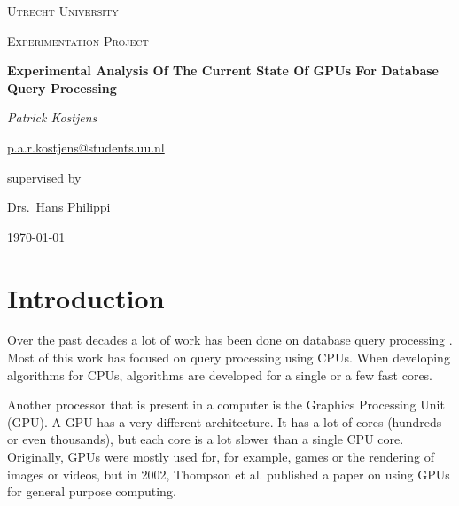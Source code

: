 \documentclass[a4paper,titlepage]{article}
\begin{document}
\begin{titlepage}
	\centering
	{\scshape\LARGE Utrecht University \par}
	\vspace{1cm}
	{\scshape\Large Experimentation Project \par}
	\vspace{1.5cm}
	{\huge\bfseries Experimental Analysis Of The Current State Of GPUs For Database Query Processing\par}
	\vspace{2cm}
	
	{\Large\itshape Patrick Kostjens \par}
	\href{mailto:p.a.r.kostjens@students.uu.nl}{p.a.r.kostjens@students.uu.nl}
	\vfill
	
	supervised by\par
	Drs.~Hans Philippi
	\vfill

	{\large \today\par}
\end{titlepage}

\begin{abstract}
So far, database query processing has mostly been done using CPUs. However, recent research shows that GPUs might be able to improve the query processing performance. In this experimental analysis, we implement filter and join algorithms on both the CPU and the GPU. We compare their performance and look at some important factors that influence the performance. This gives us an idea of the current possibilities of GPUs for database query processing. We find that there are some problems with GPUs that severely limit the current applications. However, GPUs do have the potential to play an important role in speeding up database queries.

\textbf{Keywords:} query processing, graphics processing unit, relational database, parallel processing, CUDA
\end{abstract}

\section{Introduction}
Over the past decades a lot of work has been done on database query processing \cite{selinger1979,king1981,bratbergsengen1984}. Most of this work has focused on query processing using CPUs. When developing algorithms for CPUs, algorithms are developed for a single or a few fast cores.

Another processor that is present in a computer is the Graphics Processing Unit (GPU). A GPU has a very different architecture. It has a lot of cores (hundreds or even thousands), but each core is a lot slower than a single CPU core. Originally, GPUs were mostly used for, for example, games or the rendering of images or videos, but in 2002, Thompson et al. \cite{thompson2002} published a paper on using GPUs for general purpose computing.
\end{document}
